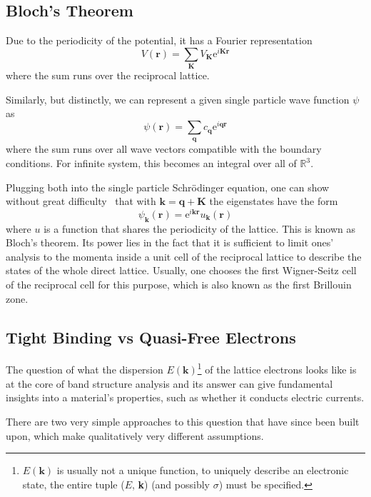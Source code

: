 \documentclass[a4paper,DIV=12,english]{scrartcl}
\begin{document}
\subsection{Bloch's Theorem}
Due to the periodicity of the potential, it has a Fourier representation
\begin{equation}
    V(\textbf{r}) = \sum_\textbf{K} V_\textbf{K} \text{e}^{i\textbf{K}\textbf{r}} 
\end{equation}
where the sum runs over the reciprocal lattice.

Similarly, but distinctly, we can represent a given single particle wave function $\psi$ as 
\begin{equation}
    \psi(\textbf{r}) = \sum_\textbf{q} c_\textbf{q} \text{e}^{i\textbf{q}\textbf{r}} 
\end{equation}
where the sum runs over all wave vectors compatible with the boundary conditions. For infinite system, this becomes an integral over all of $\mathbb{R}^3$.

Plugging both into the single particle Schrödinger equation, one can show without great difficulty~\cite{Thijssen2007cp} that with $\textbf{k}=\textbf{q} + \textbf{K}$ the eigenstates have the form 
\begin{equation}
    \psi_\textbf{k}(\textbf{r}) = \text{e}^{i\textbf{k}\textbf{r}} u_\textbf{k}(\textbf{r})
\end{equation}
where $u$ is a function that shares the periodicity of the lattice. This is known as Bloch's theorem. Its power lies in the fact that it is sufficient to limit ones' analysis to the momenta inside a unit cell of the reciprocal lattice to describe the states of the whole direct lattice. Usually, one chooses the first Wigner-Seitz cell of the reciprocal cell for this purpose, which is also known as the first Brillouin zone.

\subsection{Tight Binding vs Quasi-Free Electrons}
The question of what the dispersion $E(\textbf{k})$\footnote{$E(\textbf{k})$ is usually not a unique function, to uniquely describe an electronic state, the entire tuple ($E$, \textbf{k}) (and possibly $\sigma$) must be specified.} of the lattice electrons looks like is at the core of band structure analysis and its answer can give fundamental insights into a material's properties, such as whether it conducts electric currents.

There are two very simple approaches to this question that have since been built upon, which make qualitatively very different assumptions.
\end{document}

